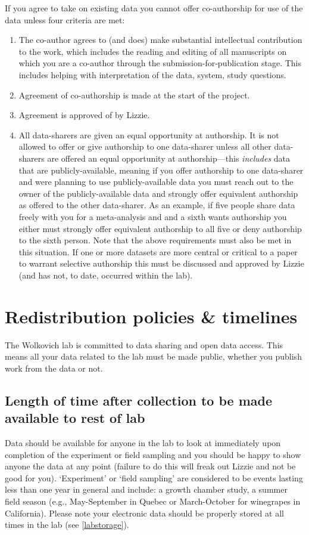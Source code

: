 \documentclass[11pt,a4paper,oneside]{article}
\begin{document}
If you agree to take on existing data you cannot offer co-authorship for use of the data unless four criteria are met:
\begin{enumerate}
\item The co-author agrees to (and does) make substantial intellectual contribution to the work, which includes the reading and editing of all manuscripts on which you are a co-author through the submission-for-publication stage. This includes helping with interpretation of the data, system, study questions. 
\item Agreement of co-authorship is made at the start of the project.
\item Agreement is approved of by Lizzie.
\item All data-sharers are given an equal opportunity at authorship. It is not allowed to offer or give authorship to one data-sharer unless all other data-sharers are offered an equal opportunity at authorship---this \emph{includes} data that are publicly-available, meaning if you offer authorship to one data-sharer and were planning to use publicly-available data you must reach out to the owner of the publicly-available data and strongly offer equivalent authorship as offered to the other data-sharer. As an example, if five people share data freely with you for a meta-analysis and and a sixth wants authorship you either must strongly offer equivalent authorship to all five or deny authorship to the sixth person. Note that the above requirements must also be met in this situation. If one or more datasets are more central or critical to a paper to warrant selective authorship this must be discussed and approved by Lizzie (and has not, to date, occurred within the lab). 
\end{enumerate}

\section{Redistribution policies \& timelines}
\label{redistrib}
The Wolkovich lab is committed to data sharing and open data access. This means all your data related to the lab must be made public, whether you publish work from the data or not. 

\subsection{Length of time after collection to be made available to rest of lab}
Data should be available for anyone in the lab to look at immediately upon completion of the experiment or field sampling and you should be happy to show anyone the data at any point (failure to do this will freak out Lizzie and not be good for you). `Experiment' or `field sampling' are considered to be events lasting less than one year in general and include: a growth chamber study, a summer field season (e.g., May-September in Quebec or March-October for winegrapes in California). Please note your electronic data should be properly stored at all times in the lab (see \ref{labstorage}).
	
\end{document}
